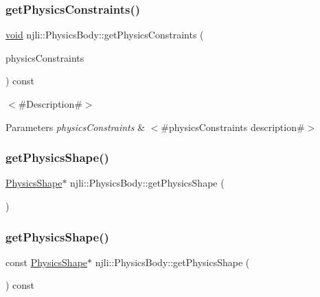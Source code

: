 \subsubsection{\texorpdfstring{get\+Physics\+Constraints()}{getPhysicsConstraints()}}
{\footnotesize\ttfamily \mbox{\hyperlink{_thread_8h_af1e856da2e658414cb2456cb6f7ebc66}{void}} njli\+::\+Physics\+Body\+::get\+Physics\+Constraints (\begin{DoxyParamCaption}\item[{std\+::vector$<$ \mbox{\hyperlink{classnjli_1_1_physics_constraint}{Physics\+Constraint}} $\ast$$>$ \&}]{physics\+Constraints }\end{DoxyParamCaption}) const}

$<$\#\+Description\#$>$


\begin{DoxyParams}{Parameters}
{\em physics\+Constraints} & $<$\#physics\+Constraints description\#$>$ \\
\hline
\end{DoxyParams}
\mbox{\label{classnjli_1_1_physics_body_a3a502c491f089c573083b9958045924a}} 
\subsubsection{\texorpdfstring{get\+Physics\+Shape()}{getPhysicsShape()}\hspace{0.1cm}{\footnotesize\ttfamily [1/2]}}
{\footnotesize\ttfamily \mbox{\hyperlink{classnjli_1_1_physics_shape}{Physics\+Shape}}$\ast$ njli\+::\+Physics\+Body\+::get\+Physics\+Shape (\begin{DoxyParamCaption}{ }\end{DoxyParamCaption})}

\mbox{\label{classnjli_1_1_physics_body_aa03d33a7cb2e4da061f23265c250808c}} 
\subsubsection{\texorpdfstring{get\+Physics\+Shape()}{getPhysicsShape()}\hspace{0.1cm}{\footnotesize\ttfamily [2/2]}}
{\footnotesize\ttfamily const \mbox{\hyperlink{classnjli_1_1_physics_shape}{Physics\+Shape}}$\ast$ njli\+::\+Physics\+Body\+::get\+Physics\+Shape (\begin{DoxyParamCaption}{ }\end{DoxyParamCaption}) const}

